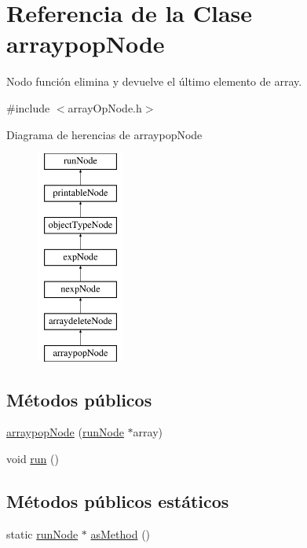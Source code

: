 \hypertarget{classarraypopNode}{\section{Referencia de la Clase arraypop\-Node}
\label{classarraypopNode}
}


Nodo función elimina y devuelve el último elemento de array.  




{\ttfamily \#include $<$array\-Op\-Node.\-h$>$}

Diagrama de herencias de arraypop\-Node\begin{figure}[H]
\begin{center}
\leavevmode
\includegraphics[height=7.000000cm]{classarraypopNode}
\end{center}
\end{figure}
\subsection*{Métodos públicos}
\begin{DoxyCompactItemize}
\item 
\hyperlink{classarraypopNode_a728f90285d083e62396e4d6b72684d90}{arraypop\-Node} (\hyperlink{classrunNode}{run\-Node} $\ast$array)
\item 
void \hyperlink{classarraypopNode_a5a96f6ab8867ca653bbe74ec8f4c1d4b}{run} ()
\end{DoxyCompactItemize}
\subsection*{Métodos públicos estáticos}
\begin{DoxyCompactItemize}
\item 
static \hyperlink{classrunNode}{run\-Node} $\ast$ \hyperlink{classarraypopNode_a5a6ac267a6db71b6d3e0b64657e81d34}{as\-Method} ()
\end{DoxyCompactItemize}


